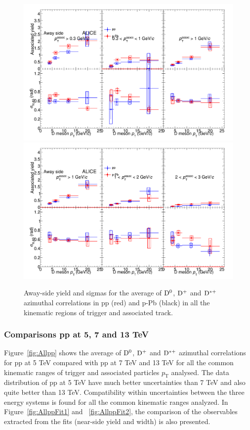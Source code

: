 \begin{figure}
\centering
\includegraphics[width=.95\linewidth]{figures/CfrPPandModels/CompareFitResults_ppVspPb_5TeV_AwaySide_1.png}
\includegraphics[width=.95\linewidth]{figures/CfrPPandModels/CompareFitResults_ppVspPb_5TeV_AwaySide_2.png}
\caption{Away-side yield and sigmas for the average of ${\rm D^0}$, ${\rm D^+}$ and ${\rm D^{*+}}$ azimuthal correlations in pp (red) and p-Pb (black) in all the kinematic regions of trigger and associated track.}
\label{fig:pp-pPb_Fit}
\end{figure}


\subsubsection{Comparisons pp at 5, 7 and 13 TeV}
Figure~\ref{fig:Allpp} shows the average of ${\rm D^0}$, ${\rm D^+}$ and ${\rm D^{*+}}$ azimuthal correlations for pp at 5 TeV compared with pp at 7 TeV and 13 TeV for all the common kinematic ranges of trigger and associated particles $p_\mathrm{T}$ analysed. The data distribution of pp at 5 TeV have much better uncertainties than 7 TeV and also quite better than 13 TeV. Compatibility within uncertainties between the three energy systems is found for all the common kinematic ranges analyzed. In Figure~\ref{fig:AllppFit1} and ~\ref{fig:AllppFit2}, the comparison of the observables extracted from the fits (near-side yield and width) is also presented.



